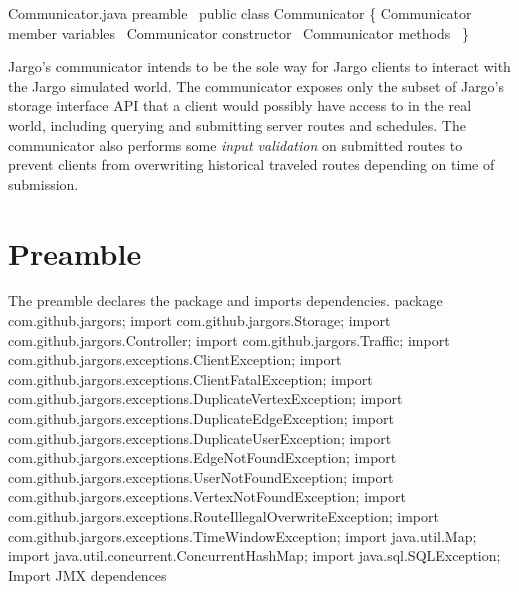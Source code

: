 \nwenddocs{}\endmoddef{}
\LA{}Communicator.java preamble~{\nwtagstyle{}}\RA{}
public class Communicator \{
  \LA{}\code{}Communicator\edoc{} member variables~{\nwtagstyle{}}\RA{}
  \LA{}\code{}Communicator\edoc{} constructor~{\nwtagstyle{}}\RA{}
  \LA{}\code{}Communicator\edoc{} methods~{\nwtagstyle{}}\RA{}
\}
\nwendcode{}\nwdocspar

Jargo's communicator intends to be the sole way for Jargo clients to interact
with the Jargo simulated world. The communicator exposes only the subset of
Jargo's storage interface API that a client would possibly have access to in
the real world, including querying and submitting server routes and schedules.
The communicator also performs some \emph{input validation} on submitted routes
to prevent clients from overwriting historical traveled routes depending on
time of submission.

\section{Preamble}
The preamble declares the package and imports dependencies.
\nwenddocs{}\endmoddef{}
package com.github.jargors;
\nwendcode{}\nwdocspar
\nwenddocs{}\plusendmoddef
import com.github.jargors.Storage;
import com.github.jargors.Controller;
import com.github.jargors.Traffic;
import com.github.jargors.exceptions.ClientException;
import com.github.jargors.exceptions.ClientFatalException;
import com.github.jargors.exceptions.DuplicateVertexException;
import com.github.jargors.exceptions.DuplicateEdgeException;
import com.github.jargors.exceptions.DuplicateUserException;
import com.github.jargors.exceptions.EdgeNotFoundException;
import com.github.jargors.exceptions.UserNotFoundException;
import com.github.jargors.exceptions.VertexNotFoundException;
import com.github.jargors.exceptions.RouteIllegalOverwriteException;
import com.github.jargors.exceptions.TimeWindowException;
import java.util.Map;
import java.util.concurrent.ConcurrentHashMap;
import java.sql.SQLException;
\LA{}Import JMX dependences~{\nwtagstyle{}}\RA{}
\nwendcode{}\nwdocspar

